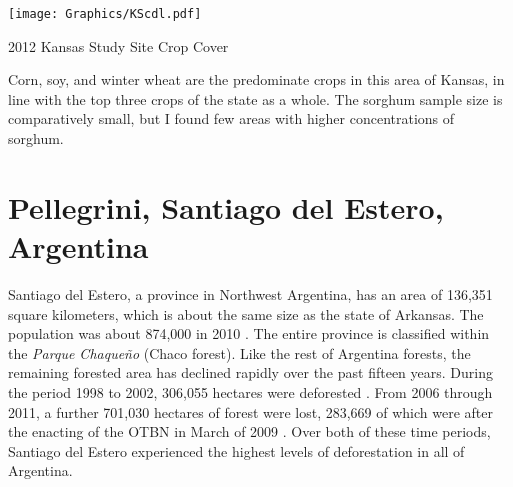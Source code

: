 \begin{ssfigure}
  \centering
  \texttt{[image: Graphics/KScdl.pdf]}
  \caption{2012 Kansas Study Site Crop Cover}
  \label{fig:KScdl}
  \medskip
  \small
  Corn, soy, and winter wheat are the predominate crops in this area of Kansas, in line with the top three crops of the state as a whole. The sorghum sample size is comparatively small, but I found few areas with higher concentrations of sorghum.
\end{ssfigure}

\section{Pellegrini, Santiago del Estero, Argentina}
\label{studyareas:pellegrini}

Santiago del Estero, a province in Northwest Argentina, has an area of 136,351 square kilometers, which is about the same size as the state of Arkansas. The population was about 874,000 in 2010 \autocite{estadistica-y-c2010a}. The entire province is classified within the \textit{Parque Chaqueño} (Chaco forest). Like the rest of Argentina forests, the remaining forested area has declined rapidly over the past fifteen years. During the period 1998 to 2002, 306,055 hectares were deforested \autocite{secretaria-de-a2007informe}. From 2006 through 2011, a further 701,030 hectares of forest were lost, 283,669 of which were after the enacting of the OTBN in March of 2009 \autocite{secreteria-de-a2012monitoreo}. Over both of these time periods, Santiago del Estero experienced the highest levels of deforestation in all of Argentina.

